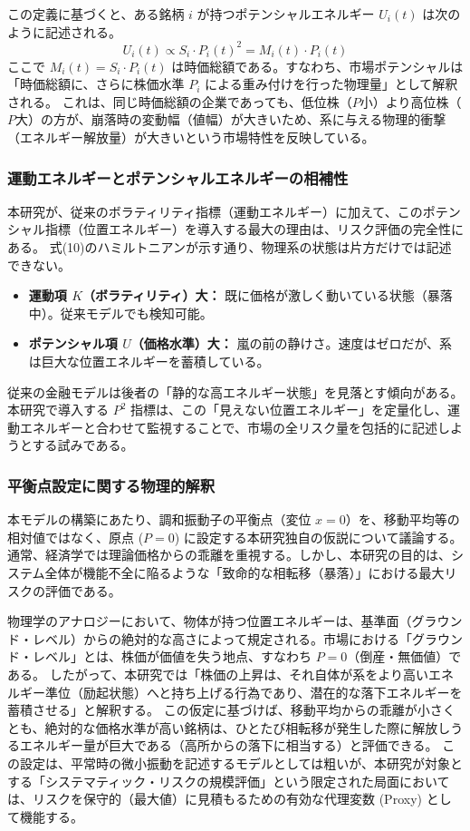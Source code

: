 \documentclass[11pt,a4paper,oneside]{ltjsarticle}
\begin{document}
この定義に基づくと、ある銘柄 $i$ が持つポテンシャルエネルギー $U_i(t)$ は次のように記述される。
\begin{equation}
U_i(t) \propto S_i \cdot P_i(t)^2 = M_i(t) \cdot P_i(t)
\end{equation}
ここで $M_i(t) = S_i \cdot P_i(t)$ は時価総額である。すなわち、市場ポテンシャルは「時価総額に、さらに株価水準 $P_i$ による重み付けを行った物理量」として解釈される。
これは、同じ時価総額の企業であっても、低位株（$P$小）より高位株（$P$大）の方が、崩落時の変動幅（値幅）が大きいため、系に与える物理的衝撃（エネルギー解放量）が大きいという市場特性を反映している。

\subsubsection{運動エネルギーとポテンシャルエネルギーの相補性}
本研究が、従来のボラティリティ指標（運動エネルギー）に加えて、このポテンシャル指標（位置エネルギー）を導入する最大の理由は、リスク評価の完全性にある。
式(10)のハミルトニアンが示す通り、物理系の状態は片方だけでは記述できない。

\begin{itemize}
    \item \textbf{運動項 $K$（ボラティリティ）大：} 既に価格が激しく動いている状態（暴落中）。従来モデルでも検知可能。
    \item \textbf{ポテンシャル項 $U$（価格水準）大：} 嵐の前の静けさ。速度はゼロだが、系は巨大な位置エネルギーを蓄積している。
\end{itemize}

従来の金融モデルは後者の「静的な高エネルギー状態」を見落とす傾向がある。本研究で導入する $P^2$ 指標は、この「見えない位置エネルギー」を定量化し、運動エネルギーと合わせて監視することで、市場の全リスク量を包括的に記述しようとする試みである。

\subsubsection{平衡点設定に関する物理的解釈}
本モデルの構築にあたり、調和振動子の平衡点（変位 $x=0$）を、移動平均等の相対値ではなく、原点 ($P=0$) に設定する本研究独自の仮説について議論する。
通常、経済学では理論価格からの乖離を重視する。しかし、本研究の目的は、システム全体が機能不全に陥るような「致命的な相転移（暴落）」における最大リスクの評価である。

物理学のアナロジーにおいて、物体が持つ位置エネルギーは、基準面（グラウンド・レベル）からの絶対的な高さによって規定される。市場における「グラウンド・レベル」とは、株価が価値を失う地点、すなわち $P=0$（倒産・無価値）である。
したがって、本研究では「株価の上昇は、それ自体が系をより高いエネルギー準位（励起状態）へと持ち上げる行為であり、潜在的な落下エネルギーを蓄積させる」と解釈する。
この仮定に基づけば、移動平均からの乖離が小さくとも、絶対的な価格水準が高い銘柄は、ひとたび相転移が発生した際に解放しうるエネルギー量が巨大である（高所からの落下に相当する）と評価できる。
この設定は、平常時の微小振動を記述するモデルとしては粗いが、本研究が対象とする「システマティック・リスクの規模評価」という限定された局面においては、リスクを保守的（最大値）に見積もるための有効な代理変数 (Proxy) として機能する。
\end{document}
